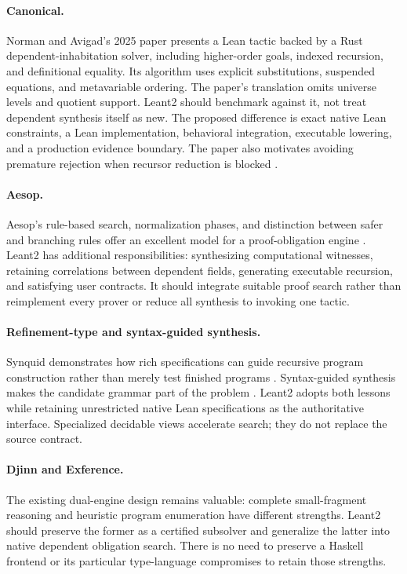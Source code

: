 \documentclass[11pt,a4paper]{article}
\theoremstyle{remark}
\begin{document}
\paragraph{Canonical.} Norman and Avigad's 2025 paper presents a Lean tactic backed by a Rust dependent-inhabitation solver, including higher-order goals, indexed recursion, and definitional equality. Its algorithm uses explicit substitutions, suspended equations, and metavariable ordering. The paper's translation omits universe levels and quotient support. Leant2 should benchmark against it, not treat dependent synthesis itself as new. The proposed difference is exact native Lean constraints, a Lean implementation, behavioral integration, executable lowering, and a production evidence boundary. The paper also motivates avoiding premature rejection when recursor reduction is blocked \cite{canonical}.

\paragraph{Aesop.} Aesop's rule-based search, normalization phases, and distinction between safer and branching rules offer an excellent model for a proof-obligation engine \cite{aesop}. Leant2 has additional responsibilities: synthesizing computational witnesses, retaining correlations between dependent fields, generating executable recursion, and satisfying user contracts. It should integrate suitable proof search rather than reimplement every prover or reduce all synthesis to invoking one tactic.

\paragraph{Refinement-type and syntax-guided synthesis.} Synquid demonstrates how rich specifications can guide recursive program construction rather than merely test finished programs \cite{synquid}. Syntax-guided synthesis makes the candidate grammar part of the problem \cite{sygus}. Leant2 adopts both lessons while retaining unrestricted native Lean specifications as the authoritative interface. Specialized decidable views accelerate search; they do not replace the source contract.

\paragraph{Djinn and Exference.} The existing dual-engine design remains valuable: complete small-fragment reasoning and heuristic program enumeration have different strengths. Leant2 should preserve the former as a certified subsolver and generalize the latter into native dependent obligation search. There is no need to preserve a Haskell frontend or its particular type-language compromises to retain those strengths.
\end{document}
